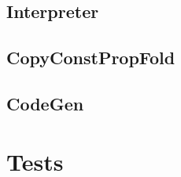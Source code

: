 \documentclass[a4paper]{article}
\begin{document}
\subsection{Interpreter}
\subsection{CopyConstPropFold}
\subsection{CodeGen}
\section{Tests}
\end{document}
